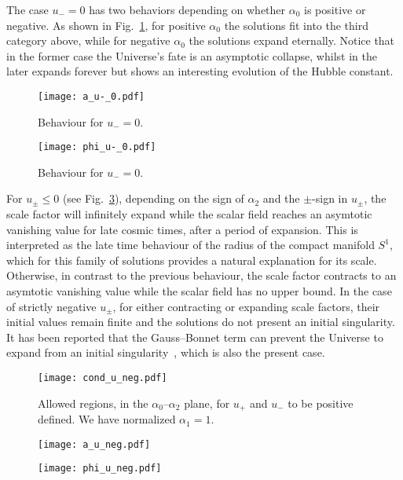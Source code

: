 \documentclass[aps,prd,12pt,superscriptaddress,showpacs,showkeys,longbibliography,reprint,nofootinbib]{revtex4-1}
\begin{document}
The case $u_- = 0$ has two behaviors depending on whether $\alpha_0$ is positive or negative. As shown in Fig.~\ref{a_u_0}, for positive $\alpha_0$ the solutions fit into the third category above, while for negative $\alpha_0$ the solutions expand eternally. Notice that in the former case the Universe's fate is an asymptotic collapse, whilst in the later expands forever but shows an interesting evolution of the Hubble constant.
\begin{figure}[H]
  \texttt{[image: a\_u-\_0.pdf]} 
  \caption{Behaviour for $u_- = 0$.}
  \label{a_u_0}
\end{figure}
\begin{figure}[H]
  \texttt{[image: phi\_u-\_0.pdf]}
  \caption{Behaviour for $u_- = 0$.}
  \label{phi_u_0}
\end{figure}


For $u_\pm\leq 0$ (see Fig.~\ref{cond_u_neg}), depending on the sign
of $\alpha_2$ and the $\pm$-sign in $u_\pm$, the scale factor will
infinitely expand while the scalar field reaches an asymtotic
vanishing value for late cosmic times, after a period of
expansion. This is interpreted as the late time behaviour of the
radius of the compact manifold $S^1$, which for this family of
solutions provides a natural explanation for its scale. Otherwise, in
contrast to the previous behaviour, the scale factor contracts to an
asymtotic vanishing value while the scalar field has no upper
bound. In the case of strictly negative $u_\pm$, for either
contracting or expanding scale factors, their initial values remain
finite and the solutions do not present an initial singularity. It has
been reported that the Gauss--Bonnet term can prevent the Universe to
expand from an initial
singularity~\cite{Deruelle:1986iv,Henriques:1986jw,Ishihara:1986if},
which is also the present case.

\begin{figure}[H]
  \texttt{[image: cond\_u\_neg.pdf]}
  \caption{Allowed regions, in the $\alpha_0$--$\alpha_2$ plane, for $u_+$ and $u_-$ to be positive defined. We have normalized $\alpha_1 = 1$.}
  \label{cond_u_neg}  
\end{figure}
\begin{figure}[H]
  \texttt{[image: a\_u\_neg.pdf]}
  \caption{}
  \label{a_u_neg}
\end{figure}
\begin{figure}[H]
  \texttt{[image: phi\_u\_neg.pdf]}
  \caption{}
  \label{phi_u_neg}
\end{figure}
\end{document}
